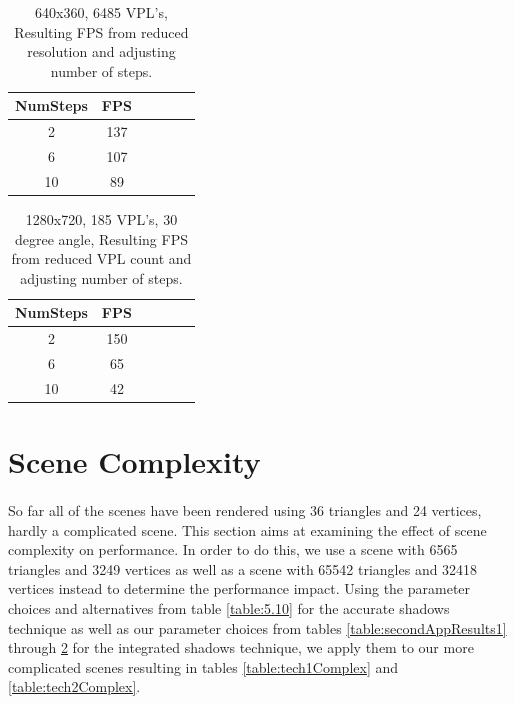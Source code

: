 \begin{table}[h!]\centering
	\caption{640x360, 6485 VPL's, Resulting FPS from reduced resolution and adjusting number of steps.}
	\begin{center}
	    \begin{tabular}{ | c | c | c | c | c | c |}
	    \hline
	    NumSteps & FPS\\ \hline
	    2 & 137\\ \hline
	    6 & 107\\ \hline
	    10 & 89\\ \hline
	    \end{tabular}
	\end{center}
	\label{table:secondAppResults2}
\end{table}

\begin{table}[h!]\centering
	\caption{1280x720, 185 VPL's, 30 degree angle, Resulting FPS from reduced VPL count and adjusting number of steps.}
	\begin{center}
	    \begin{tabular}{ | c | c | c | c | c | c |}
	    \hline
	    NumSteps & FPS\\ \hline
	    2 & 150\\ \hline
	    6 & 65\\ \hline
	    10 & 42\\ \hline
	    \end{tabular}
	\end{center}
	\label{table:secondAppResults3}
\end{table}

\section{Scene Complexity}
\paragraph{}
So far all of the scenes have been rendered using 36 triangles and 24 vertices, hardly a complicated scene.  This section aims at examining the effect of scene complexity on performance.  In order to do this, we use a scene with 6565 triangles and 3249 vertices as well as a scene with 65542 triangles and 32418 vertices instead to determine the performance impact.  Using the parameter choices and alternatives from table \ref{table:5.10} for the accurate shadows technique as well as our parameter choices from tables \ref{table:secondAppResults1} through \ref{table:secondAppResults3} for the integrated shadows technique, we apply them to our more complicated scenes resulting in tables \ref{table:tech1Complex} and \ref{table:tech2Complex}.

